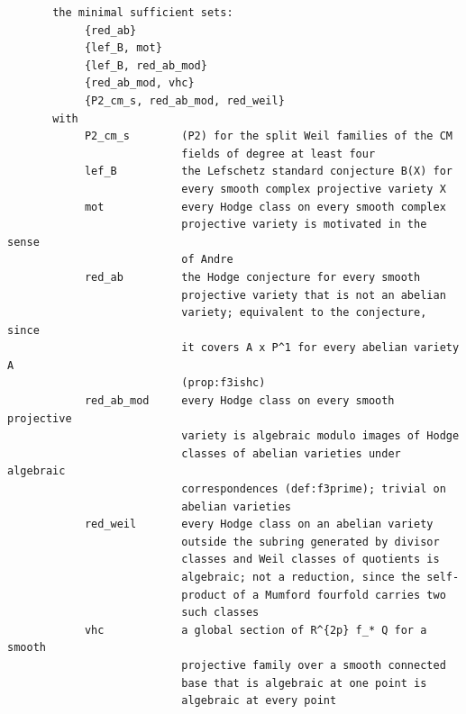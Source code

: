 \begin{small}
\begin{verbatim}
       the minimal sufficient sets:
            {red_ab}
            {lef_B, mot}
            {lef_B, red_ab_mod}
            {red_ab_mod, vhc}
            {P2_cm_s, red_ab_mod, red_weil}
       with
            P2_cm_s        (P2) for the split Weil families of the CM
                           fields of degree at least four
            lef_B          the Lefschetz standard conjecture B(X) for
                           every smooth complex projective variety X
            mot            every Hodge class on every smooth complex
                           projective variety is motivated in the sense
                           of Andre
            red_ab         the Hodge conjecture for every smooth
                           projective variety that is not an abelian
                           variety; equivalent to the conjecture, since
                           it covers A x P^1 for every abelian variety A
                           (prop:f3ishc)
            red_ab_mod     every Hodge class on every smooth projective
                           variety is algebraic modulo images of Hodge
                           classes of abelian varieties under algebraic
                           correspondences (def:f3prime); trivial on
                           abelian varieties
            red_weil       every Hodge class on an abelian variety
                           outside the subring generated by divisor
                           classes and Weil classes of quotients is
                           algebraic; not a reduction, since the self-
                           product of a Mumford fourfold carries two
                           such classes
            vhc            a global section of R^{2p} f_* Q for a smooth
                           projective family over a smooth connected
                           base that is algebraic at one point is
                           algebraic at every point


\end{verbatim}
\end{small}
